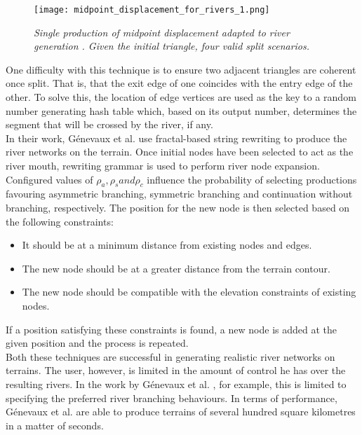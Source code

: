 \begin{figure}[h]
  \centering
	\texttt{[image: midpoint\_displacement\_for\_rivers\_1.png]}
	\caption{\textit{Single production of midpoint displacement adapted to river generation \cite{Prusinkiewicz1993}. Given the initial triangle, four valid split scenarios.}}
	\label{fig:single_prod_of_midpoint_displacement}
\end{figure}

One difficulty with this technique is to ensure two adjacent triangles are coherent once split. That is, that the exit edge of one coincides with the entry edge of the other. To solve this, the location of edge vertices are used as the key to a random number generating hash table which, based on its output number, determines the segment that will be crossed by the river, if any.  \\

In their work, Génevaux et al. \cite{Genevaux2013} use fractal-based string rewriting to produce the river networks on the terrain. Once initial nodes have been selected to act as the river mouth, rewriting grammar is used to perform river node expansion. Configured values of $\rho_{a}, \rho_{s} and \rho_{c}$ influence the probability of selecting productions favouring asymmetric branching, symmetric branching and continuation without branching, respectively. The position for the new node is then selected based on the following constraints:
\begin{itemize}
\item It should be at a minimum distance from existing nodes and edges.
\item The new node should be at a greater distance from the terrain contour.
\item The new node should be compatible with the elevation constraints of existing nodes.
\end{itemize}
If a position satisfying these constraints is found, a new node is added at the given position and the process is repeated.\\

Both these techniques are successful in generating realistic river networks on terrains. The user, however, is limited in the amount of control he has over the resulting rivers. In the work by Génevaux et al. \cite{Genevaux2013}, for example, this is limited to specifying the preferred river branching behaviours. In terms of performance, Génevaux et al. \cite{Genevaux2013} are able to produce terrains of several hundred square kilometres in a matter of seconds.

